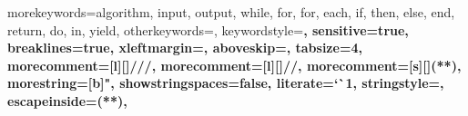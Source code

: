 


%
{
  morekeywords={algorithm, input, output, while, for, for, each, if, then, else, end, return, do, in, yield},
  otherkeywords={},
  keywordstyle=\fontsize{9}{10}\bfseries,
  sensitive=true,
  breaklines=true,
  xleftmargin=\parindent,
  aboveskip=\bigskipamount,
  tabsize=4,
  morecomment=[l][\color{greencomments}]{///},
  morecomment=[l][\color{greencomments}]{//},
  morecomment=[s][\color{greencomments}]{{(*}{*)}},
  morestring=[b]",
  showstringspaces=false,
  literate={`}{\`}1,
  stringstyle=\color{redstrings},
  escapeinside={(*}{*)},
}





\usepackage[acronym, toc, nopostdot, style=super, nonumberlist]{glossaries}


\usepackage[squaren]{SIunits}


%
\usepackage{setspace}

%
\raggedbottom     %


\usepackage[%
   automark,	 %
   nouppercase,	 %
]{scrpage2}

